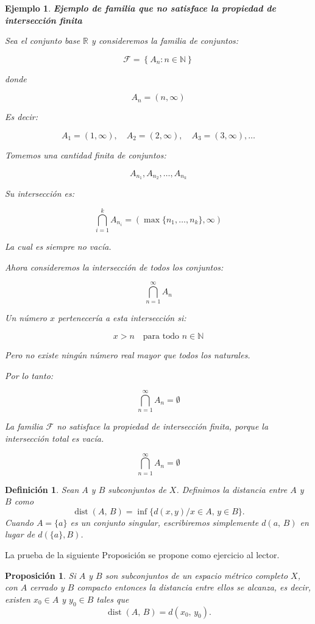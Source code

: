 \documentclass[x11names, 12pt]{book}
\newtheorem{definicion}{Definición}
\newtheorem{example}{Ejemplo}
\newtheorem{proposicion}{Proposición}
\DeclareMathOperator{\dist}{dist}
\begin{document}
\begin{example}
\textbf{Ejemplo de familia que no satisface la propiedad de intersección finita}

Sea el conjunto base $\mathbb{R}$ y consideremos la familia de conjuntos:

\[
\mathcal{F} = \left\{ A_n : n \in \mathbb{N} \right\}
\]

donde

\[
A_n = (n, \infty)
\]

Es decir:

\[
A_1 = (1,\infty), \quad
A_2 = (2,\infty), \quad
A_3 = (3,\infty), \dots
\]


Tomemos una cantidad finita de conjuntos:

\[
A_{n_1}, A_{n_2}, \dots, A_{n_k}
\]

Su intersección es:

\[
\bigcap_{i=1}^{k} A_{n_i}
=
\left( \max\{n_1,\dots,n_k\}, \infty \right)
\]

La cual es siempre no vacía.



Ahora consideremos la intersección de todos los conjuntos:

\[
\bigcap_{n=1}^{\infty} A_n
\]

Un número $x$ pertenecería a esta intersección si:

\[
x > n \quad \text{para todo } n \in \mathbb{N}
\]

Pero no existe ningún número real mayor que todos los naturales.

Por lo tanto:

\[
\bigcap_{n=1}^{\infty} A_n = \emptyset
\]



La familia $\mathcal{F}$ no satisface la propiedad de intersección finita,
porque la intersección total es vacía.

\[
\bigcap_{n=1}^{\infty} A_n = \emptyset \]
\end{example}

\begin{definicion}
Sean $A$ y $B$ subconjuntos de $X$. Definimos la distancia entre $A$ y $B$ como
    \[\dist (A,\, B)= \inf \{d(x,y)/ x\in A,\, y\in B \}.\]
    Cuando $A=\{a\}$ es un conjunto singular, escribiremos simplemente $d(a,\, B)$ en lugar de $d(\{a\}, B)$.  
\end{definicion}
La prueba de la siguiente Proposición se propone como ejercicio al lector.

\begin{proposicion}\label{dist_AyB}
Si $A$ y $B$ son subconjuntos de un espacio métrico completo $X$, con $A$ cerrado y $B$ compacto entonces la distancia entre ellos se alcanza, es decir, existen $x_0\in A$ y $y_0\in B$ tales que \[\dist (A,\, B)=d(x_0,\, y_0) .\]
\end{proposicion}
\end{document}
